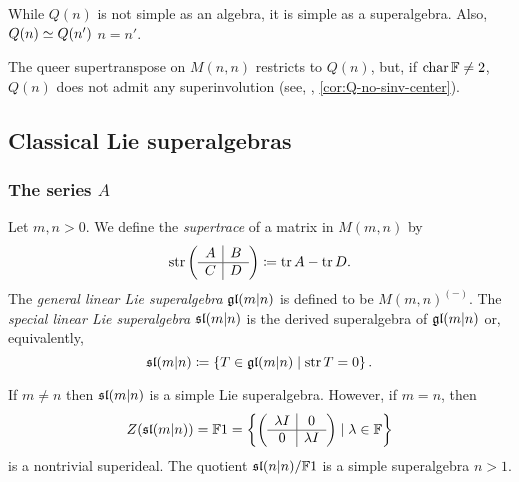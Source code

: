 While $Q(n)$ is not simple as an algebra, it is simple as a superalgebra. 
Also, $Q(n) \simeq Q(n')$ \IFF $n=n'$.

The queer supertranspose on $M(n,n)$ restricts to $Q(n)$, but, if $\operatorname{char} \mathbb{F} \neq 2$,
$Q(n)$ does not admit any superinvolution (see, \eg, \cref{cor:Q-no-sinv-center}). 



\subsection{Classical Lie superalgebras}\label{sec:defi-classical-SA}

\subsubsection{The series $A$} 

Let $m,n > 0$. 
We define the \emph{supertrace} of a matrix in $M(m,n)$ by
\[
    \operatorname{str} 
    \left(\begin{array}{c|c}
        A & B\\
        \hline
        C & D
    \end{array}\right)
    \coloneqq \operatorname{tr} A - \operatorname{tr} D.
\]
%
The \emph{general linear Lie superalgebra} $\mathfrak{gl}(m|n)$ is defined to be $M(m,n)^{(-)}$. 
The \emph{special linear Lie superalgebra} $\mathfrak{sl} (m|n)$ is the derived superalgebra of $\mathfrak{gl}(m|n)$ or, equivalently,
%
\[
    \mathfrak{sl}(m|n) \coloneqq \left\{
	T \in \mathfrak{gl}(m|n)
	\mid \operatorname{str} T = 0
	\right\}.
\]
%

If $m\neq n$ then $\mathfrak{sl}(m|n)$ is a simple Lie superalgebra. 
However, if $m=n$, then
\[
    Z(\mathfrak{sl}(m|n)) = \mathbb{F} 1 = \left\{
    \left(\begin{array}{c|c}
        \lambda I & 0\\
        \hline
        0 & \lambda I
    \end{array}\right)
	\mid \lambda \in \mathbb{F}
	\right\}
\]
is a nontrivial superideal. 
The quotient $\mathfrak{sl}(n|n)/ \mathbb{F} 1$ is a simple superalgebra \IFF $n > 1$. 

